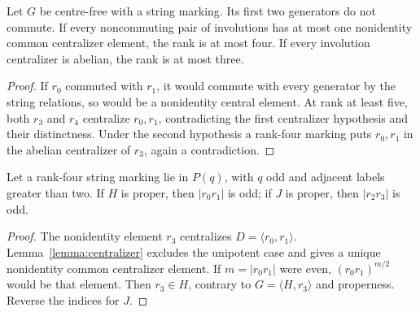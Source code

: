 \begin{lemma}\label{lemma:rank}
Let $G$ be centre-free with a string marking. Its first two generators do
not commute. If every noncommuting pair of involutions has at most one
nonidentity common centralizer element, the rank is at most four. If every
involution centralizer is abelian, the rank is at most three.
\end{lemma}
\begin{proof}
If $r_0$ commuted with $r_1$, it would commute with every generator by the
string relations, so would be a nonidentity central element. At rank at
least five, both $r_3$ and $r_4$ centralize $r_0,r_1$, contradicting the
first centralizer hypothesis and their distinctness. Under the second
hypothesis a rank-four marking puts $r_0,r_1$ in the abelian centralizer
of $r_3$, again a contradiction.
\end{proof}

\begin{lemma}\label{lemma:odd}
Let a rank-four string marking lie in $P(q)$, with $q$ odd and adjacent
labels greater than two. If $H$ is proper, then $|r_0r_1|$ is odd; if
$J$ is proper, then $|r_2r_3|$ is odd.
\end{lemma}
\begin{proof}
The nonidentity element $r_3$ centralizes $D=\langle r_0,r_1\rangle$.
Lemma~\ref{lemma:centralizer} excludes the unipotent case and gives a
unique nonidentity common centralizer element. If $m=|r_0r_1|$ were even,
$(r_0r_1)^{m/2}$ would be that element. Then $r_3\in H$, contrary to
$G=\langle H,r_3\rangle$ and properness. Reverse the indices for $J$.
\end{proof}

